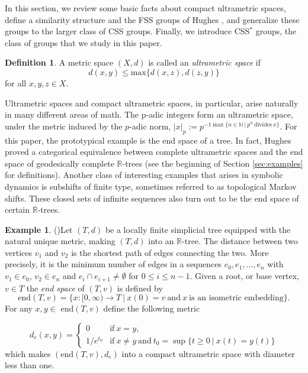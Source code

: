 \documentclass[12pt]{amsart}
\numberwithin{equation}{subsection}
\theoremstyle{definition}
\theoremstyle{definition}
\newtheorem{definition}[theorem]{Definition}
\newtheorem{example}[theorem]{Example}
\theoremstyle{remark}
\begin{document}
In this section, we review some basic facts about compact ultrametric spaces, define a similarity structure and the FSS groups of Hughes \cite{hughes2009}, and generalize these groups to the larger class of CSS groups. Finally, we introduce CSS$^*$ groups, the class of groups that we study in this paper. 



\begin{definition}
    A metric space $(X,d)$ is called an \textit{ultrametric space} if 
    $$d(x,y) \leq \text{max} \{d(x,z), d(z,y)\}$$
    for all $x, y, z \in X$.
\end{definition}

Ultrametric spaces and compact ultrametric spaces, in particular, arise naturally in many different areas of math. The p-adic integers form an ultrametric space, under the metric induced by the $p$-adic norm, $\vert x \vert_p := p^{-1\max \{n \in \mathbb N \: \vert \: p^n \: \text{divides} \: x\}}$. For this paper, the prototypical example is the end space of a tree. In fact, Hughes proved a categorical equivalence between complete ultrametric spaces and the end space of geodesically complete $\mathbb R$-trees \cite{hughes2004treescategorical} (see the beginning of Section \ref{sec:examples} for definitions). Another class of interesting examples that arises in symbolic dynamics is subshifts of finite type, sometimes referred to as topological Markov shifts. These closed sets of infinite sequences also turn out to be the end space of certain $\mathbb R$-trees. 

\begin{example}(\cite[Example 2.2]{hughes2009})\label{ex:treemetric}
    Let $(T,d)$ be a locally finite simplicial tree equipped with the natural unique metric, making $(T,d)$ into an $\mathbb{R}$-tree. The distance between two vertices $v_1$ and $v_2$ is the shortest path of edges connecting the two. More precisely, it is the minimum number of edges in a sequences $e_0, e_1, \dots, e_n$ with $v_1 \in e_0$, $v_2 \in e_n$ and $e_i \cap e_{i+1} \neq \emptyset$ for $0 \leq i \leq n-1$. Given a root, or base vertex, $v \in T$ the \textit{end space} of $(T,v)$ is defined by 
    \[\text{end}(T,v) = \{ x: [0, \infty) \rightarrow T \: \vert \:x(0)=v\:  \text{and} \: x \: \text{is an isometric embedding}\}. \]
    For any $x, y \in$ end$(T,v)$ define the following metric

   
        \[d_e(x,y) = \begin{cases}
            0 & \text{if} \: x = y, \\
            1/e^{t_0} & \text{if} \: x \neq y \:\text{and} \ t_0 = \sup\{t \geq 0 \: \vert \: x(t) = y(t) \} 
        \end{cases}\]
    which makes $(\text{end}(T, v), d_e)$ into a compact ultrametric space with diameter less than one. 
    
\end{example}
\end{document}
